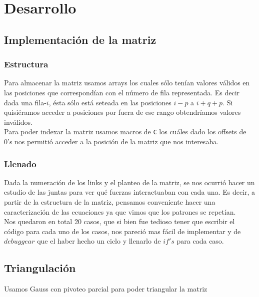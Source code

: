 \section{Desarrollo}

\subsection{Implementación de la matriz}

\subsubsection{Estructura}

Para almacenar la matriz usamos arrays los cuales sólo tenían valores válidos en las posiciones que correspondían con el número de fila representada. Es decir dada una fila-$i$, ésta sólo está seteada en las posiciones $i - p$ a $i + q + p$. Si quisiéramos acceder a posiciones por fuera de ese rango obtendríamos valores inválidos.\\

Para poder indexar la matriz usamos macros de \verb|C| los cuáles dado los offsets de 0's nos permitió acceder a la posición de la matriz que nos interesaba.

\subsubsection{Llenado}

Dada la numeración de los links y el planteo de la matriz, se nos ocurrió hacer un estudio de las juntas para ver qué fuerzas interactuaban con cada una. Es decir, a partir de la estructura de la matriz, pensamos conveniente hacer una caracterización de las ecuaciones ya que vimos que los patrones se repetían.\\

Nos quedaron en total 20 casos, que si bien fue tedioso tener que escribir el código para cada uno de los casos, nos pareció mas fácil de implementar y de $debuggear$ que el haber hecho un ciclo y llenarlo de $if's$ para cada caso.

\subsection{Triangulación}

Usamos Gauss con pivoteo parcial para poder triangular la matriz
